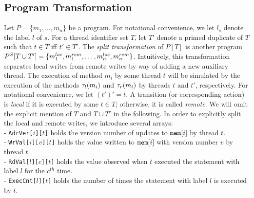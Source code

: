 \subsection{Program Transformation}
\label{subsec:program-transformation}
Let $P=\{m_1,\ldots,m_n\}$ be a program.
For notational convenience, we let $l_s$ denote the label $l$ of $s$.%
For a thread identifier set $T$, let $T'$ denote a primed duplicate of $T$ such that $t\in T$ iff $t'\in T'$.
The {\em split transformation} of $P[T]$ is another program $P^S[T\cup T']=\{m^{loc}_1,m^{rem}_1,\ldots,m^{loc}_n,m^{rem}_n\}$.
Intuitively, this transformation separates local writes from remote writes by way of adding a new auxiliary thread.
The execution of method $m_i$ by some thread $t$ will be simulated by the execution of the methods $\tau_{l}(m_i)$ and $\tau_{r}(m_i)$ by threads $t$ and $t'$, respectively.
For notational convenience, we let $(t')'=t$.
A transition (or corresponding action) is {\em local} if it is executed by some $t\in T$; otherwise, it is called {\em remote}.
We will omit the explicit mention of $T$ and $T\cup T'$ in the following.
In order to explicitly split the local and remote writes, we introduce several arrays:\\
- {\tt AdrVer[$i$][$t$]} holds the version number of updates to $\mathtt{mem}[i]$ by thread $t$.\\
- {\tt WrVal[$i$][$v$][$t$]} holds the value written to $\mathtt{mem}[i]$ with version number $v$ by thread $t$.\\
- {\tt RdVal[$l$][$c$][$t$]} holds the value observed when $t$ executed the statement with label $l$ for the $c^{th}$ time.\\
- {\tt ExecCnt[$l$][$t$]} holds the number of times the statement with label $l$ is executed by $t$.\\

